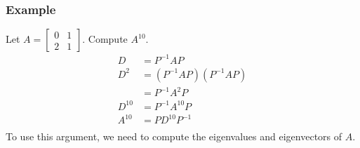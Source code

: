 \documentclass{math}
\begin{document}
\subsubsection*{Example}
Let \( A = \begin{bmatrix}0 & 1 \\ 2 & 1\end{bmatrix} \). Compute \( A^{10} \).
\begin{align*}
  D &= P^{-1}AP \\
  D^2 &= (P^{-1}AP)(P^{-1}AP) \\
  &= P^{-1}A^2P \\
  D^{10} &= P^{-1}A^{10}P \\
  A^{10} &= PD^{10}P^{-1} \\
\end{align*}
To use this argument, we need to compute the eigenvalues and eigenvectors of
\( A \).
\end{document}
